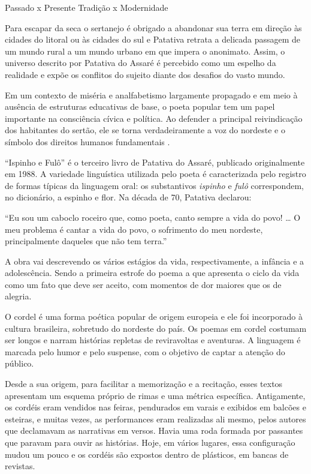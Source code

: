 \documentclass[12pt]{extarticle}
\begin{document}
Passado x Presente
Tradição x Modernidade

Para escapar da seca o sertanejo é obrigado a abandonar sua terra em 
direção às cidades do litoral ou às cidades do sul e Patativa retrata a 
delicada passagem de um mundo rural a um mundo urbano em que impera o 
anonimato. Assim, o universo descrito por Patativa do Assaré é percebido 
como um espelho da realidade e expõe os conflitos do sujeito diante dos 
desafios do vasto mundo. 

Em um contexto de miséria e analfabetismo largamente propagado e em meio 
à ausência de estruturas educativas de base, o poeta popular tem um 
papel importante na consciência cívica e política. Ao defender a principal 
reivindicação dos habitantes do sertão, ele se torna verdadeiramente a 
voz do nordeste e o símbolo dos direitos humanos fundamentais .

``Ispinho e Fulô'' é o terceiro livro de Patativa do Assaré, publicado 
originalmente em 1988. A variedade linguística utilizada pelo poeta é 
caracterizada pelo registro de formas típicas da linguagem oral: os 
substantivos \textit{ispinho} e \textit{fulô} correspondem, no dicionário, 
a espinho e flor. Na década de 70, Patativa declarou:

``Eu sou um caboclo roceiro que, como poeta, canto sempre a vida do povo! 
{}\ldots{} O meu problema é cantar a vida do povo, o sofrimento do meu 
nordeste, principalmente daqueles que não tem terra.''
 
A obra vai descrevendo os vários estágios da vida, respectivamente, a 
infância e a adolescência. Sendo a primeira estrofe do poema a que 
apresenta o ciclo da vida como um fato que deve ser aceito, com momentos 
de dor maiores que os de alegria.

O cordel é uma forma poética popular de origem europeia e ele foi 
incorporado à cultura brasileira, sobretudo do nordeste do país. 
Os poemas em cordel costumam ser longos e narram histórias repletas de 
reviravoltas e aventuras. A linguagem é marcada pelo humor e pelo 
suspense, com o objetivo de captar a atenção do público. 
 
Desde a sua origem, para facilitar a memorização e a recitação, esses 
textos apresentam um esquema próprio de rimas e uma métrica específica. 
Antigamente, os cordéis eram vendidos nas feiras, pendurados em varais e 
exibidos em balcões e esteiras, e muitas vezes, as performances eram 
realizadas ali mesmo, pelos autores que declamavam as narrativas em versos. 
Havia uma roda formada por passantes que paravam para ouvir as histórias. 
Hoje, em vários lugares, essa configuração mudou um pouco e os cordéis 
são expostos dentro de plásticos, em bancas de revistas.
 
\end{document}
